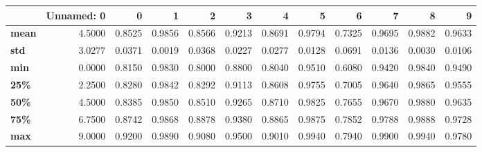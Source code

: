 \begin{tabular}{lrrrrrrrrrrr}
\toprule
{} &  Unnamed: 0 &       0 &       1 &       2 &       3 &       4 &       5 &       6 &       7 &       8 &       9 \\
\midrule
\textbf{mean} &      4.5000 &  0.8525 &  0.9856 &  0.8566 &  0.9213 &  0.8691 &  0.9794 &  0.7325 &  0.9695 &  0.9882 &  0.9633 \\
\textbf{std } &      3.0277 &  0.0371 &  0.0019 &  0.0368 &  0.0227 &  0.0277 &  0.0128 &  0.0691 &  0.0136 &  0.0030 &  0.0106 \\
\textbf{min } &      0.0000 &  0.8150 &  0.9830 &  0.8000 &  0.8800 &  0.8040 &  0.9510 &  0.6080 &  0.9420 &  0.9840 &  0.9490 \\
\textbf{25\% } &      2.2500 &  0.8280 &  0.9842 &  0.8292 &  0.9113 &  0.8608 &  0.9755 &  0.7005 &  0.9640 &  0.9865 &  0.9555 \\
\textbf{50\% } &      4.5000 &  0.8385 &  0.9850 &  0.8510 &  0.9265 &  0.8710 &  0.9825 &  0.7655 &  0.9670 &  0.9880 &  0.9635 \\
\textbf{75\% } &      6.7500 &  0.8742 &  0.9868 &  0.8878 &  0.9380 &  0.8865 &  0.9875 &  0.7852 &  0.9788 &  0.9888 &  0.9728 \\
\textbf{max } &      9.0000 &  0.9200 &  0.9890 &  0.9080 &  0.9500 &  0.9010 &  0.9940 &  0.7940 &  0.9900 &  0.9940 &  0.9780 \\
\bottomrule
\end{tabular}
